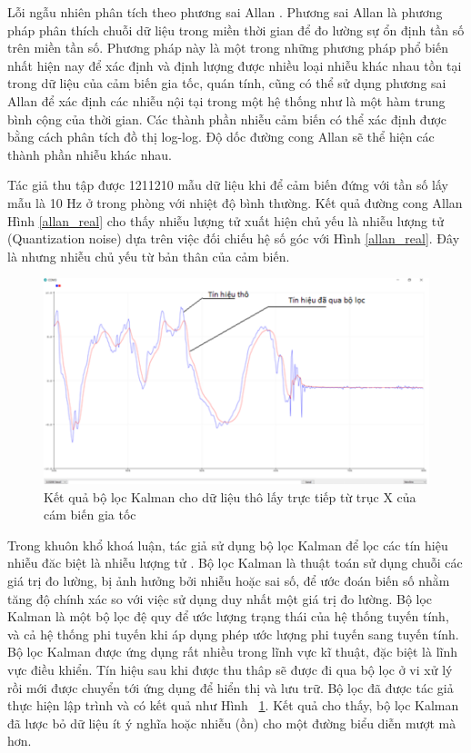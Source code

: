 Lỗi ngẫu nhiên phân tích theo phương sai Allan \cite{allan}. Phương sai Allan là phương pháp phân thích chuỗi dữ liệu trong miền thời gian để đo lường sự ổn định tần số trên miền tần số. Phương pháp này là một trong những phương pháp phổ biến nhất hiện nay để xác định và định lượng được nhiều loại nhiễu khác nhau tồn tại trong dữ liệu của cảm biến gia tốc, quán tính, cũng có thể sử dụng phương sai Allan để xác định các nhiễu nội tại trong một hệ thống như là một hàm trung bình cộng của thời gian. Các thành phần nhiễu cảm biến có thể xác định được bằng cách phân tích đồ thị log-log. Độ dốc đường cong Allan sẽ thể hiện các thành phần nhiễu khác nhau.

Tác giả thu tập được 1211210 mẫu dữ liệu khi để cảm biến đứng với tần số lấy mẫu là 10 Hz ở trong phòng với nhiệt độ bình thường. Kết quả đường cong Allan Hình \ref{allan_real} cho thấy nhiễu lượng tử xuất hiện chủ yếu là nhiễu lượng tử (Quantization noise) dựa trên việc đối chiếu hệ số góc với Hình \ref{allan_real}. Đây là nhưng nhiễu chủ yếu từ bản thân của cảm biến.


\begin{figure}[!]
		\centering
 		\includegraphics[width=1\textwidth]{images/kalman.png}
		\caption{Kết quả bộ lọc Kalman cho dữ liệu thô lấy trực tiếp từ trục X của cám biến gia tốc}
		\label{kalman}
\end{figure}
Trong khuôn khổ khoá luận, tác giả sử dụng bộ lọc Kalman để lọc các tín hiệu nhiễu đăc biệt là nhiễu lượng tử \cite{kalman}. Bộ lọc Kalman là thuật toán sử dụng chuỗi các giá trị đo lường, bị ảnh hưởng bởi nhiễu hoặc sai số, để ước đoán biến số nhằm tăng độ chính xác so với việc sử dụng duy nhất một giá trị đo lường. Bộ lọc Kalman là một bộ lọc đệ quy để ước lượng trạng thái của hệ thống tuyến tính, và cả hệ thống phi tuyến khi áp dụng phép ước lượng phi tuyến sang tuyến tính. Bộ lọc Kalman được ứng dụng rất nhiều trong lĩnh vực kĩ thuật, đặc biệt là lĩnh vực điều khiển. Tín hiệu sau khi được thu thâp sẽ được đi qua bộ lọc ở vi xử lý rồi mới được chuyển tới ứng dụng để hiển thị và lưu trữ. Bộ lọc đã được tác giả thực hiện lập trình và có kết quả như Hình ~\ref{kalman}. Kết quả cho thấy, bộ lọc Kalman đã lược bỏ dữ liệu ít ý nghĩa hoặc nhiễu (ồn) cho một đường biểu diễn mượt mà hơn.





